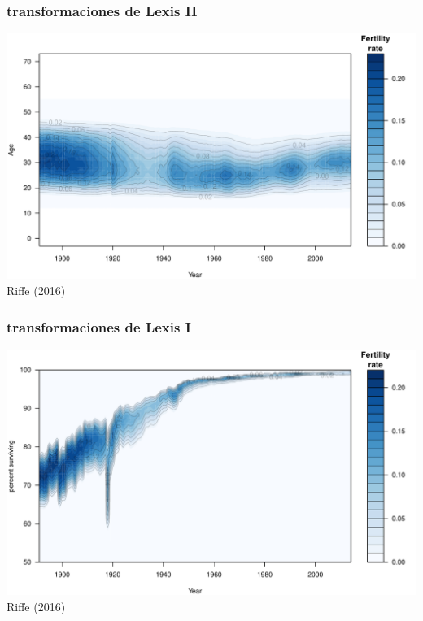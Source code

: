 \documentclass[20pt]{beamer}
\begin{document}
\begin{frame}
\frametitle{transformaciones de Lexis II}
\includegraphics[scale=.9]{Figures/FertAPC.pdf}\\
Riffe (2016)
\end{frame}

\begin{frame}
\frametitle{transformaciones de Lexis I}
\includegraphics[scale=.9]{Figures/FertQuant.pdf}\\
Riffe (2016)
\end{frame}

\end{document}
